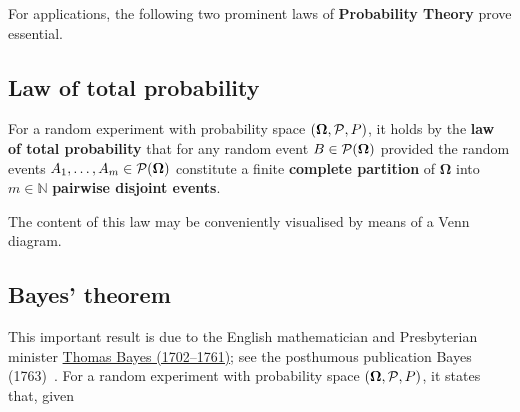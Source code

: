 \medskip
\noindent
For applications, the following two prominent laws of
\textbf{Probability Theory} prove essential.

\subsection[Law of total probability]{Law of total probability}
For a random experiment with probability space 
$\left(\boldsymbol{\Omega}, {\cal P}, P\right)$, it holds by the 
\textbf{law of total probability} that for any random event $B \in 
{\cal P}(\boldsymbol{\Omega})$
%
\be
{}
\ee
%
provided the random events $A_{1}, \ldots, A_{m} \in 
{\cal P}(\boldsymbol{\Omega})$ constitute a finite \textbf{complete 
partition} of $\boldsymbol{\Omega}$ into $m \in \mathbb{N}$
\textbf{pairwise disjoint events}.

\medskip
\noindent
The content of this law may be conveniently visualised by means of 
a Venn diagram.

\subsection[Bayes' theorem]{Bayes' theorem}
This important result is due to the English mathematician and
Presbyterian minister 
\href{http://www-history.mcs.st-and.ac.uk/Biographies/Bayes.html}{Thomas Bayes (1702--1761)}; see the posthumous publication Bayes 
(1763)~. For a random experiment with probability space
$\left(\boldsymbol{\Omega}, {\cal P}, P\right)$, it states that,
given

